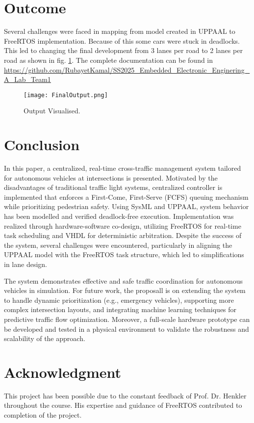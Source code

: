 \documentclass[conference]{IEEEtran}
\begin{document}
\section{Outcome}
Several challenges were faced in mapping from model created in UPPAAL to FreeRTOS implementation. Because of this some cars were stuck in deadlocks. This led to changing the final development from 3 lanes per road to 2 lanes per road as shown in fig. \ref{fig:final output}. The complete documentation can be found in \url{https://github.com/RubayetKamal/SS2025_Embedded_Electronic_Enginering_A_Lab_Team1}
\begin{figure}[h!]
    \centering
    \texttt{[image: FinalOutput.png]}
    \caption{Output Visualised.}
    \label{fig:final output}
\end{figure}



\section{Conclusion}
In this paper, a centralized, real-time cross-traffic management system tailored for autonomous vehicles at intersections is presented. Motivated by the disadvantages of traditional traffic light systems, centralized controller is implemented that enforces a First-Come, First-Serve (FCFS) queuing mechanism while prioritizing pedestrian safety. Using SysML and UPPAAL, system behavior has been modelled and verified deadlock-free execution. Implementation was realized through hardware-software co-design, utilizing FreeRTOS for real-time task scheduling and VHDL for deterministic arbitration. Despite the success of the system, several challenges were encountered, particularly in aligning the UPPAAL model with the FreeRTOS task structure, which led to simplifications in lane design. 

The system demonstrates effective and safe traffic coordination for autonomous vehicles in simulation. For future work, the proposall is on extending the system to handle dynamic prioritization (e.g., emergency vehicles), supporting more complex intersection layouts, and integrating machine learning techniques for predictive traffic flow optimization. Moreover, a full-scale hardware prototype can be developed and tested in a physical environment to validate the robustness and scalability of the approach.

\section*{Acknowledgment}
This project has been possible due to the constant feedback of Prof. Dr. Henkler throughout the course. His expertise and guidance of FreeRTOS contributed to completion of the project.
\end{document}
